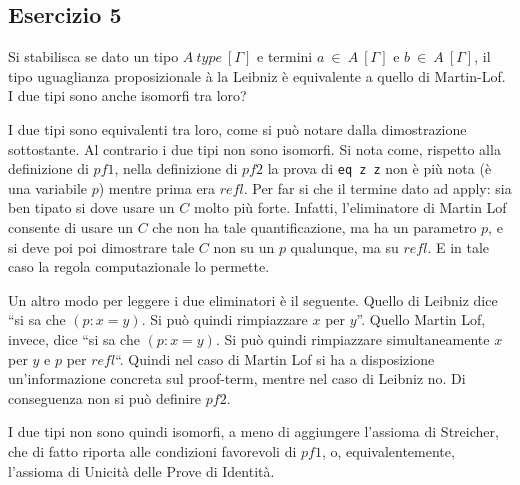 

\subsection{Esercizio 5}
\begin{thm}
	Si stabilisca se dato un tipo $A~type~[\Gamma]$ e termini $a~\in~A~[\Gamma]$ e $b~\in~A~[\Gamma]$, il tipo uguaglianza proposizionale à la Leibniz è equivalente a quello di Martin-Lof. I due tipi sono anche isomorfi tra loro?
\end{thm}
I due tipi sono equivalenti tra loro, come si può notare dalla dimostrazione sottostante. Al contrario i due tipi non sono isomorfi. Si nota come, rispetto alla definizione di $pf1$, nella definizione di $pf2$ la prova di \texttt{eq z z} non è più nota (è una variabile $p$) mentre prima era $refl$. Per far si che il termine dato ad apply: sia ben tipato si dove usare un $C$ molto più forte. Infatti, l'eliminatore di Martin Lof consente di usare un $C$ che non ha tale quantificazione, ma ha un parametro $p$, e si deve poi poi dimostrare tale $C$ non su un $p$ qualunque, ma su $refl$.  E in tale caso la regola computazionale lo permette.

Un altro modo per leggere i due eliminatori è il seguente. Quello di Leibniz dice ``si sa che $(p : x = y)$. Si può quindi rimpiazzare $x$ per $y$''. Quello Martin Lof, invece, dice ``si sa che $(p : x = y)$. Si può quindi rimpiazzare simultaneamente $x$ per $y$ e $p$ per $refl$``. Quindi nel caso di Martin Lof si ha a disposizione un'informazione concreta sul proof-term, mentre nel caso di Leibniz no. Di conseguenza non si può definire $pf2$.

I due tipi non sono quindi isomorfi, a meno di aggiungere l'assioma di Streicher, che di fatto riporta alle condizioni favorevoli di $pf1$, o, equivalentemente, l'assioma di Unicità delle Prove di Identità.
